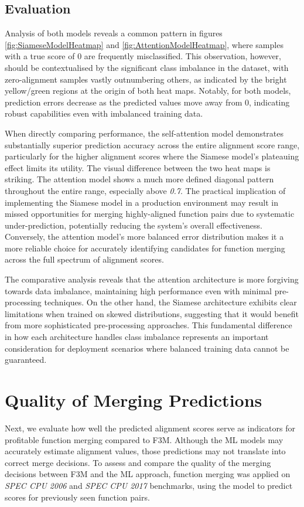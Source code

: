 \subsection{Evaluation}
Analysis of both models reveals a common pattern in figures \ref{fig:SiameseModelHeatmap} and \ref{fig:AttentionModelHeatmap}, where samples with a true score of 0 are frequently misclassified. This observation, however, should be contextualised by the significant class imbalance in the dataset, with zero-alignment samples vastly outnumbering others, as indicated by the bright yellow/green regions at the origin of both heat maps. Notably, for both models, prediction errors decrease as the predicted values move away from 0, indicating robust capabilities even with imbalanced training data.

When directly comparing performance, the self-attention model demonstrates substantially superior prediction accuracy across the entire alignment score range, particularly for the higher alignment scores where the Siamese model's plateauing effect limits its utility. The visual difference between the two heat maps is striking. The attention model shows a much more defined diagonal pattern throughout the entire range, especially above \textit{0.7}. The practical implication of implementing the Siamese model in a production environment may result in missed opportunities for merging highly-aligned function pairs due to systematic under-prediction, potentially reducing the system's overall effectiveness. Conversely, the attention model's more balanced error distribution makes it a more reliable choice for accurately identifying candidates for function merging across the full spectrum of alignment scores.

The comparative analysis reveals that the attention architecture is more forgiving towards data imbalance, maintaining high performance even with minimal pre-processing techniques. On the other hand, the Siamese architecture exhibits clear limitations when trained on skewed distributions, suggesting that it would benefit from more sophisticated pre-processing approaches. This fundamental difference in how each architecture handles class imbalance represents an important consideration for deployment scenarios where balanced training data cannot be guaranteed.

\section{Quality of Merging Predictions} \label{Eval:MergeQuality}
Next, we evaluate how well the predicted alignment scores serve as indicators for profitable function merging compared to F3M. Although the ML models may accurately estimate alignment values, those predictions may not translate into correct merge decisions. To assess and compare the quality of the merging decisions between F3M and the ML approach, function merging was applied on \textit{SPEC CPU 2006} and \textit{SPEC CPU 2017} benchmarks, using the model to predict scores for previously seen function pairs.

